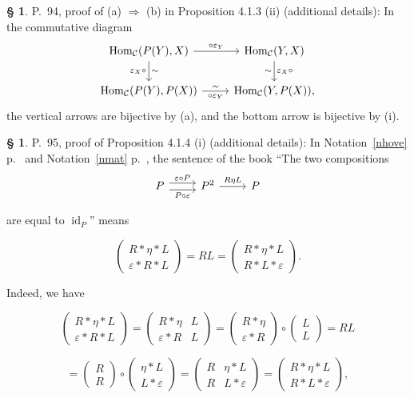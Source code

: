 \documentclass[12pt]{article}%
\theoremstyle{remark}
\theoremstyle{definition}
\newtheorem{s}[thm]{\S}%
\newcommand{\nn}{\noindent}
\newcommand{\C}{\mathcal C}
\newcommand{\ee}{\varepsilon}
\newcommand{\then}{\Rightarrow}
\DeclareMathOperator{\id}{id}
\DeclareMathOperator{\Hom}{Hom}%
\begin{document}
%

\begin{s} 
P.~94, proof of (a) $\then$ (b) in Proposition 4.1.3 (ii) (additional details): In the commutative diagram 
$$
\begin{tikzcd}
\Hom_\C(P(Y),X)\ar{d}{\sim}[swap]{\varepsilon_X\circ}\ar{r}{\circ\varepsilon_Y}&\Hom_\C(Y,X)\ar{d}{\varepsilon_X\circ}[swap]{\sim}\\ 
\Hom_\C(P(Y),P(X))\ar{r}[swap]{\circ\varepsilon_Y}{\sim}&\Hom_\C(Y,P(X)),
\end{tikzcd}
$$ 
the vertical arrows are bijective by (a), and the bottom arrow is bijective by (i).
\end{s}


\begin{s} 
P.~95, proof of Proposition 4.1.4 (i) (additional details): In Notation~\ref{nhove} p.~\pageref{nhove} and Notation~\ref{nmat} p.~\pageref{nmat}, the sentence of the book ``The two compositions 
$$
\begin{tikzcd}
P\ar[yshift=0.7ex]{r}{\ee\circ P}\ar[yshift=-0.7ex]{r}[swap]{P\circ\ee}&P^2\ar{r}{R\eta L}&P
\end{tikzcd}
$$ 

\nn are equal to $\id_P$'' means 

$$
\begin{pmatrix}R*\eta*L\\ \ee*R*L\end{pmatrix}
=RL=\begin{pmatrix}R*\eta*L\\ R*L*\ee\end{pmatrix}.
$$ 

\nn Indeed, we have

$$
\begin{pmatrix}R*\eta*L\\ \ee*R*L\end{pmatrix}
=\begin{pmatrix}R*\eta&L\\ \ee*R&L\end{pmatrix}
=\begin{pmatrix}R*\eta\\ \ee*R\end{pmatrix}\circ\begin{pmatrix}L\\ L\end{pmatrix}
=RL
$$

$$
=\begin{pmatrix}R\\ R\end{pmatrix}\circ\begin{pmatrix}\eta*L\\ L*\ee\end{pmatrix}
=\begin{pmatrix}R&\eta*L\\ R&L*\ee\end{pmatrix}
=\begin{pmatrix}R*\eta*L\\ R*L*\ee\end{pmatrix},
$$ 


\end{s}
\end{document}
